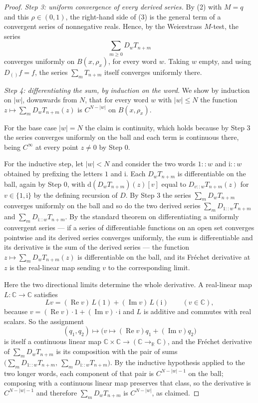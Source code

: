 \begin{proof}
\emph{Step 3: uniform convergence of every derived series.}  By (2) with
$M=q$ and this $\rho\in(0,1)$, the right-hand side of (3) is the general term
of a convergent series of nonnegative reals.  Hence, by the Weierstrass
$M$-test, the series
\[
  \sum_{m\ge0}D_wT_{n+m}
\]
converges uniformly on $B(x,\rho_x)$, for every word $w$.  Taking $w$ empty,
and using $D_{()}f=f$, the series $\sum_mT_{n+m}$ itself converges uniformly
there.

\emph{Step 4: differentiating the sum, by induction on the word.}  We show by
induction on $|w|$, downwards from $N$, that for every word $w$ with
$|w|\le N$ the function $z\mapsto\sum_mD_wT_{n+m}(z)$ is $C^{N-|w|}$ on
$B(x,\rho_x)$.

For the base case $|w|=N$ the claim is continuity, which holds because by
Step 3 the series converges uniformly on the ball and each term is continuous
there, being $C^\infty$ at every point $z\ne0$ by Step 0.

For the inductive step, let $|w|<N$ and consider the two words $1::w$ and
$\mathrm{i}::w$ obtained by prefixing the letters $1$ and $\mathrm{i}$.  Each
$D_wT_{n+m}$ is differentiable on the ball, again by Step 0, with
$\mathrm{d}(D_wT_{n+m})(z)[v]$ equal to $D_{v::w}T_{n+m}(z)$ for $v\in\{1,
\mathrm{i}\}$ by the defining recursion of $D$.  By Step 3 the series
$\sum_mD_wT_{n+m}$ converges uniformly on the ball and so do the two derived
series $\sum_mD_{1::w}T_{n+m}$ and $\sum_mD_{\mathrm{i}::w}T_{n+m}$.  By the
standard theorem on differentiating a uniformly convergent series --- if a
series of differentiable functions on an open set converges pointwise and its
derived series converges uniformly, the sum is differentiable and its
derivative is the sum of the derived series --- the function
$z\mapsto\sum_mD_wT_{n+m}(z)$ is differentiable on the ball, and its Fréchet
derivative at $z$ is the real-linear map sending $v$ to the corresponding
limit.

Here the two directional limits determine the whole derivative.  A real-linear
map $L\colon\mathbb{C}\to\mathbb{C}$ satisfies
\[
  Lv=(\operatorname{Re}v)\,L(1)+(\operatorname{Im}v)\,L(\mathrm{i})
  \qquad(v\in\mathbb{C}),
\]
because $v=(\operatorname{Re}v)\cdot1+(\operatorname{Im}v)\cdot\mathrm{i}$ and
$L$ is additive and commutes with real scalars.  So the assignment
\[
  (q_1,q_2)\longmapsto\bigl(v\mapsto(\operatorname{Re}v)q_1
    +(\operatorname{Im}v)q_2\bigr)
\]
is itself a continuous linear map $\mathbb{C}\times\mathbb{C}\to
(\mathbb{C}\to_{\mathbb{R}}\mathbb{C})$, and the Fréchet derivative of
$\sum_mD_wT_{n+m}$ is its composition with the pair of sums
$\bigl(\sum_mD_{1::w}T_{n+m},\ \sum_mD_{\mathrm{i}::w}T_{n+m}\bigr)$.  By the
inductive hypothesis applied to the two longer words, each component of that
pair is $C^{N-|w|-1}$ on the ball; composing with a continuous linear map
preserves that class, so the derivative is $C^{N-|w|-1}$ and therefore
$\sum_mD_wT_{n+m}$ is $C^{N-|w|}$, as claimed.


\end{proof}
